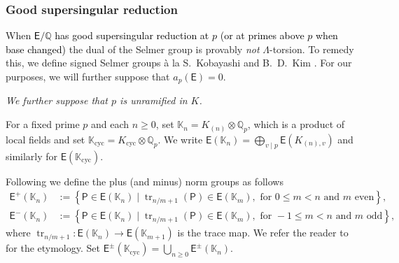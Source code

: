 \documentclass{amsart}
\newcommand{\DK}[1]{\textcolor{purple}{#1}}
\newcommand{\edit}[1]{\textcolor{black}{#1}}
\numberwithin{equation}{section}
\theoremstyle{remark}
\newcommand{\tr}{\operatorname{tr}}
\newcommand{\EC}{\mathsf{E}}
\newcommand{\Qp}{\mathbb{Q}_p}
\newcommand{\Kn}{\mathbb{K}_{n}}
\newcommand{\K}{\mathbb{K}}
\newcommand{\Zp}{\mathbb{Z}_p}
\newcommand{\Z}{\mathbb{Z}}
\newcommand{\Q}{\mathbb{Q}}
\newcommand{\cyc}{\operatorname{{cyc}}}
\newcommand{\Sel}{\operatorname{Sel}}
\theoremstyle{plain} %
\begin{document}
\subsubsection{Good supersingular reduction}
\label{prelim: good supersingular}
When \edit{$\EC/\Q$ has good supersingular reduction at $p$ (or at primes above $p$ when base changed)} %
the dual of the Selmer group is provably \emph{not} $\Lambda$-torsion.
To remedy this, we define signed Selmer groups à la S.~Kobayashi \cite{Kob03} and B.~D.~Kim \cite{BDKim13, byoung2014signed}.
For our purposes, we will further suppose that $a_p(\EC) =0$.

\smallskip

\emph{We further suppose that $p$ is unramified in $K$.}

\smallskip

For a fixed prime $p$ and each $n\geq 0$, set $\Kn = K_{(n)} \otimes \Qp$, which is a product of local fields and set $\K_{\cyc} = K_{\cyc} \otimes \Qp$.
We write $\EC(\Kn) = \bigoplus_{v\mid p} \EC(K_{(n),v})$ and similarly for $\EC(\mathbb{K}_{\cyc})$.

Following \cite{Kat21} we define the plus (and minus) norm groups as follows
\begin{align*}
\EC^+(\Kn) &:=
\left\{\mathsf{P}\in \EC(\Kn) \mid \tr_{n/m+1} (\mathsf{P})\in \EC(\K_{m}), \text{ for }0\leq m < n\text{ and }m \text{ even}\right\},\\
\EC^-(\Kn) &:=
\left\{\mathsf{P}\in \EC(\Kn) \mid \tr_{n/m+1} (\mathsf{P})\in \EC(\K_{m}),\text{ for }-1\leq m < n\text{ and }m 
\text{ odd}\right\},
\end{align*}
where $\tr_{n/m+1}:\EC(\Kn)\rightarrow \EC(\K_{m+1})$ is the trace map.
We refer the reader to \cite[Section~2]{BDKim13} for the etymology.
Set $\EC^{\pm}(\K_{\cyc}) = \bigcup_{n\geq 0} \EC^{\pm}(\Kn)$.

\end{document}
